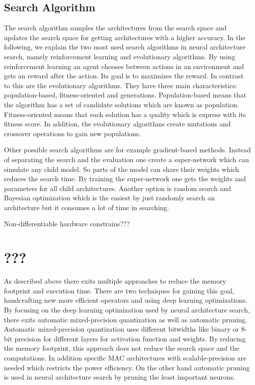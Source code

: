 \documentclass[conference]{IEEEtran}
\begin{document}
\subsection{Search Algorithm}
The search algorithm samples the architectures from the search space and updates the search space for getting architectures with a higher accuracy.
In the following, we explain the two most used search algorithms in neural architecture search, namely reinforcement learning and evolutionary algorithms. By using reinforcement learning an agent chooses between actions in an environment and gets an reward after the action. Its goal is to maximizes the reward. In contrast to this are the evolutionary algorithms. They have three main characteristics: population-based, fitness-oriented and generations. Population-based means that the algorithm has a set of candidate solutions which are known as population. Fitness-oriented means that each solution has a quality which is express with its fitness score. In addition, the evolutionary algorithms create mutations and crossover operations to gain new populations.

Other possible search algorithms are for example gradient-based methods. Instead of separating the search and the evaluation one create a super-network which can simulate any child model. So parts of the model can share their weights which reduces the search time. By training the super-network one gets the weights and parameters for all child architectures. Another option is random search and Bayesian optimization which is the easiest by just randomly search an architecture but it consumes a lot of time in searching. 

Non-differentiable hardware constrains???

\section{???}
\label{section:missing}

As described above there exits multiple approaches to reduce the memory footprint and execution time. There are two techniques for gaining this goal, handcrafting new more efficient operators and using deep learning optimizations. By focusing on the deep learning optimization used by neural architecture search, there exits automatic mixed-precision quantization as well as automatic pruning. Automatic mixed-precision quantization uses different bitwidths like binary or 8-bit precision for different layers for activation function and weights. By reducing the memory footprint, this approach does not reduce the search space and the computations. In addition specific MAC architectures with scalable-precision are needed which restricts the power efficiency. On the other hand automatic pruning is used in neural architecture search by pruning the least important neurons. 
\end{document}
